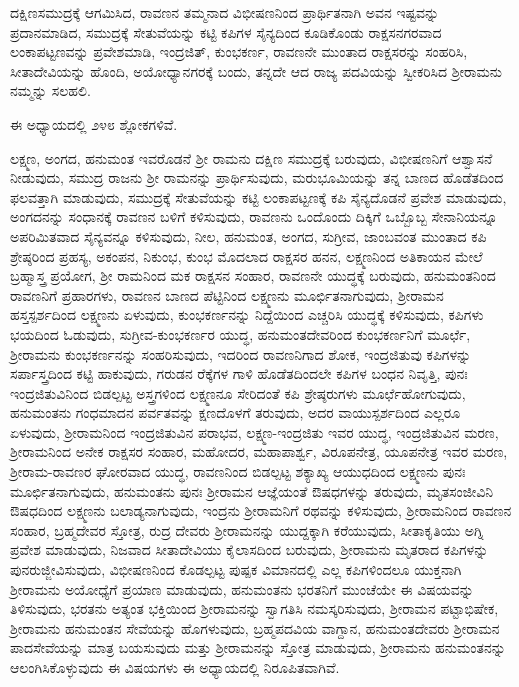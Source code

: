 ದಕ್ಷಿಣಸಮುದ್ರಕ್ಕೆ ಆಗಮಿಸಿದ, ರಾವಣನ ತಮ್ಮನಾದ ವಿಭೀಷಣನಿಂದ ಪ್ರಾರ್ಥಿತನಾಗಿ ಅವನ ಇಷ್ಟವನ್ನು ಪ್ರದಾನಮಾಡಿದ, ಸಮುದ್ರಕ್ಕೆ ಸೇತುವೆಯನ್ನು ಕಟ್ಟಿ ಕಪಿಗಳ ಸೈನ್ಯದಿಂದ ಕೂಡಿಕೊಂಡು ರಾಕ್ಷಸನಗರವಾದ ಲಂಕಾಪಟ್ಟಣವನ್ನು ಪ್ರವೇಶಮಾಡಿ, ಇಂದ್ರಜಿತ್, ಕುಂಭಕರ್ಣ, ರಾವಣನೇ ಮುಂತಾದ ರಾಕ್ಷಸರನ್ನು ಸಂಹರಿಸಿ, ಸೀತಾದೇವಿಯನ್ನು ಹೊಂದಿ, ಅಯೋಧ್ಯಾನಗರಕ್ಕೆ ಬಂದು, ತನ್ನದೇ ಆದ ರಾಜ್ಯ ಪದವಿಯನ್ನು ಸ್ವೀಕರಿಸಿದ ಶ‍್ರೀರಾಮನು ನಮ್ಮನ್ನು ಸಲಹಲಿ.

ಈ ಅಧ್ಯಾಯದಲ್ಲಿ ೨೪೮ ಶ್ಲೋಕಗಳಿವೆ.

ಲಕ್ಷ್ಮಣ, ಅಂಗದ, ಹನುಮಂತ ಇವರೊಡನೆ ಶ‍್ರೀ ರಾಮನು ದಕ್ಷಿಣ ಸಮುದ್ರಕ್ಕೆ ಬರುವುದು, ವಿಭೀಷಣನಿಗೆ ಆಶ್ವಾಸನೆ ನೀಡುವುದು, ಸಮುದ್ರ ರಾಜನು ಶ‍್ರೀ ರಾಮನನ್ನು ಪ್ರಾರ್ಥಿಸುವುದು, ಮರುಭೂಮಿಯನ್ನು ತನ್ನ ಬಾಣದ ಹೊಡೆತದಿಂದ ಫಲವತ್ತಾಗಿ ಮಾಡುವುದು, ಸಮುದ್ರಕ್ಕೆ ಸೇತುವೆಯನ್ನು ಕಟ್ಟಿ ಲಂಕಾಪಟ್ಟಣಕ್ಕೆ ಕಪಿ ಸೈನ್ಯದೊಡನೆ ಪ್ರವೇಶ ಮಾಡುವುದು, ಅಂಗದನನ್ನು ಸಂಧಾನಕ್ಕೆ ರಾವಣನ ಬಳಿಗೆ ಕಳಿಸುವುದು, ರಾವಣನು ಒಂದೊಂದು ದಿಕ್ಕಿಗೆ ಒಬ್ಬೊಬ್ಬ ಸೇನಾನಿಯನ್ನೂ ಅಪರಿಮಿತವಾದ ಸೈನ್ಯವನ್ನೂ ಕಳಿಸುವುದು, ನೀಲ, ಹನುಮಂತ, ಅಂಗದ, ಸುಗ್ರೀವ, ಜಾಂಬವಂತ ಮುಂತಾದ ಕಪಿ ಶ್ರೇಷ್ಠರಿಂದ ಪ್ರಹಸ್ಯ, ಅಕಂಪನ, ನಿಕುಂಭ, ಕುಂಭ ಮೊದಲಾದ ರಾಕ್ಷಸರ ಹನನ, ಲಕ್ಷ್ಮಣನಿಂದ ಅತಿಕಾಯನ ಮೇಲೆ ಬ್ರಹ್ಮಾಸ್ತ್ರ ಪ್ರಯೋಗ, ಶ‍್ರೀ ರಾಮನಿಂದ ಮಕ ರಾಕ್ಷಸನ ಸಂಹಾರ, ರಾವಣನೇ ಯುದ್ಧಕ್ಕೆ ಬರುವುದು, ಹನುಮಂತನಿಂದ ರಾವಣನಿಗೆ ಪ್ರಹಾರಗಳು, ರಾವಣನ ಬಾಣದ ಪೆಟ್ಟಿನಿಂದ ಲಕ್ಷ್ಮಣನು ಮೂರ್ಛಿತನಾಗುವುದು, ಶ‍್ರೀರಾಮನ ಹಸ್ತಸ್ಪರ್ಶದಿಂದ ಲಕ್ಷ್ಮಣನು ಏಳುವುದು, ಕುಂಭಕರ್ಣನನ್ನು ನಿದ್ದೆಯಿಂದ ಎಚ್ಚರಿಸಿ ಯುದ್ಧಕ್ಕೆ ಕಳಿಸುವುದು, ಕಪಿಗಳು ಭಯದಿಂದ ಓಡುವುದು, ಸುಗ್ರೀವ-ಕುಂಭಕರ್ಣರ ಯುದ್ಧ, ಹನುಮಂತದೇವರಿಂದ ಕುಂಭಕರ್ಣನಿಗೆ ಮೂರ್ಛೆ, ಶ‍್ರೀರಾಮನು ಕುಂಭಕರ್ಣನನ್ನು ಸಂಹರಿಸುವುದು, ಇದರಿಂದ ರಾವಣನಿಗಾದ ಶೋಕ, ಇಂದ್ರಜಿತುವು ಕಪಿಗಳನ್ನು ಸರ್ಪಾಸ್ತ್ರದಿಂದ ಕಟ್ಟಿ ಹಾಕುವುದು, ಗರುಡನ ರೆಕ್ಕೆಗಳ ಗಾಳಿ ಹೊಡೆತದಿಂದಲೇ ಕಪಿಗಳ ಬಂಧನ ನಿವೃತ್ತಿ, ಪುನಃ ಇಂದ್ರಜಿತುವಿನಿಂದ ಬಿಡಲ್ಪಟ್ಟ ಅಸ್ತ್ರಗಳಿಂದ ಲಕ್ಷ್ಮಣನೂ ಸೇರಿದಂತೆ ಕಪಿ ಶ್ರೇಷ್ಠರುಗಳು ಮೂರ್ಛೆ\break ಹೋಗುವುದು, ಹನುಮಂತನು ಗಂಧಮಾದನ ಪರ್ವತವನ್ನು ಕ್ಷಣದೊಳಗೆ ತರುವುದು, ಅದರ ವಾಯುಸ್ಪರ್ಶದಿಂದ ಎಲ್ಲರೂ ಏಳುವುದು, ಶ‍್ರೀರಾಮನಿಂದ ಇಂದ್ರಜಿತುವಿನ ಪರಾಭವ, ಲಕ್ಷ್ಮಣ-ಇಂದ್ರಜಿತು ಇವರ ಯುದ್ಧ, ಇಂದ್ರಜಿತುವಿನ ಮರಣ, ಶ‍್ರೀರಾಮನಿಂದ ಅನೇಕ ರಾಕ್ಷಸರ ಸಂಹಾರ, ಮಹೋದರ, ಮಹಾಪಾರ್ಶ್ವ, ವಿರೂಪನೇತ್ರ, ಯೂಪನೇತ್ರ ಇವರ ಮರಣ, ಶ‍್ರೀರಾಮ-ರಾವಣರ ಘೋರವಾದ ಯುದ್ಧ, ರಾವಣನಿಂದ ಬಿಡಲ್ಪಟ್ಟ ಶಕ್ಯಾಖ್ಯ ಆಯುಧದಿಂದ ಲಕ್ಷ್ಮಣನು ಪುನಃ ಮೂರ್ಛಿತನಾಗುವುದು, ಹನುಮಂತನು ಪುನಃ ಶ‍್ರೀರಾಮನ ಆಜ್ಞೆಯಂತೆ ಔಷಧಗಳನ್ನು ತರುವುದು, ಮೃತಸಂಜೀವಿನಿ ಔಷಧದಿಂದ ಲಕ್ಷ್ಮಣನು ಬಲಾಡ್ಯನಾಗುವುದು, ಇಂದ್ರನು ಶ‍್ರೀರಾಮನಿಗೆ ರಥವನ್ನು ಕಳಿಸುವುದು, ಶ‍್ರೀರಾಮನಿಂದ ರಾವಣನ ಸಂಹಾರ, ಬ್ರಹ್ಮದೇವರ ಸ್ತೋತ್ರ, ರುದ್ರ ದೇವರು ಶ‍್ರೀರಾಮನನ್ನು ಯುದ್ದಕ್ಕಾಗಿ ಕರೆಯುವುದು, ಸೀತಾಕೃತಿಯು ಅಗ್ನಿ ಪ್ರವೇಶ ಮಾಡುವುದು, ನಿಜವಾದ ಸೀತಾದೇವಿಯು ಕೈಲಾಸದಿಂದ ಬರುವುದು, ಶ‍್ರೀರಾಮನು ಮೃತರಾದ ಕಪಿಗಳನ್ನು ಪುನರುಜ್ಜೀವಿಸುವುದು, ವಿಭೀಷಣನಿಂದ ಕೊಡಲ್ಪಟ್ಟ ಪುಷ್ಪಕ ವಿಮಾನದಲ್ಲಿ ಎಲ್ಲ ಕಪಿಗಳಿಂದಲೂ ಯುಕ್ತನಾಗಿ ಶ‍್ರೀರಾಮನು ಅಯೋಧ್ಯೆಗೆ ಪ್ರಯಾಣ ಮಾಡುವುದು, ಹನುಮಂತನು ಭರತನಿಗೆ ಮುಂಚೆಯೇ ಈ ವಿಷಯವನ್ನು ತಿಳಿಸುವುದು, ಭರತನು ಅತ್ಯಂತ ಭಕ್ತಿಯಿಂದ ಶ‍್ರೀರಾಮನನ್ನು ಸ್ವಾಗತಿಸಿ ನಮಸ್ಕರಿಸುವುದು, ಶ‍್ರೀರಾಮನ ಪಟ್ಟಾಭಿಷೇಕ, ಶ‍್ರೀರಾಮನು ಹನುಮಂತನ ಸೇವೆಯನ್ನು ಹೊಗಳುವುದು, ಬ್ರಹ್ಮಪದವಿಯ ವಾಗ್ದಾನ, ಹನುಮಂತದೇವರು ಶ‍್ರೀರಾಮನ ಪಾದಸೇವೆಯನ್ನು ಮಾತ್ರ ಬಯಸುವುದು ಮತ್ತು ಶ‍್ರೀರಾಮನನ್ನು ಸ್ತೋತ್ರ ಮಾಡುವುದು, ಶ‍್ರೀರಾಮನು ಹನುಮಂತನನ್ನು ಆಲಂಗಿಸಿಕೊಳ್ಳುವುದು ಈ ವಿಷಯಗಳು ಈ ಅಧ್ಯಾಯದಲ್ಲಿ ನಿರೂಪಿತವಾಗಿವೆ.


